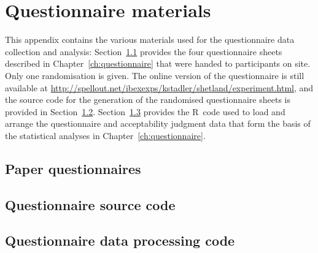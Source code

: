 \documentclass[twoside,10pt]{book}
\newcommand{\includeR}[1]{}
\begin{document}
\chapter{Questionnaire materials}
\label{app:questionnaire}
This appendix contains the various materials used for the questionnaire data collection and analysis: Section~\ref{app:paperquestionnaire} provides the four questionnaire sheets described in Chapter~\ref{ch:questionnaire} that were handed to participants on site. Only one randomisation is given. The online version of the questionnaire is still available at \url{http://spellout.net/ibexexps/kstadler/shetland/experiment.html}, and the source code %
for the generation of the randomised questionnaire sheets is provided in Section~\ref{app:questionnairecode}.
Section~\ref{app:questionnairedatacode} provides the R~code used to load and arrange the questionnaire and acceptability judgment data that form the basis of the statistical analyses in Chapter~\ref{ch:questionnaire}.

\section{Paper questionnaires}
\label{app:paperquestionnaire}
%
\section{Questionnaire source code}
\label{app:questionnairecode}




\section{Questionnaire data processing code}
\label{app:questionnairedatacode}

\includeR{questionnaire/data/shetland-data.R}
\end{document}
